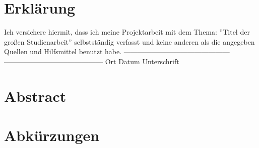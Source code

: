 \documentclass[12pt, a4paper]{scrbook}
\begin{document}

\setlength{\parindent}{0em} 
\let\cleardoublepage\relax





\section*{Erklärung}

Ich versichere hiermit, dass ich meine Projektarbeit mit dem Thema: ''Titel der großen Studienarbeit'' selbstständig verfasst und keine anderen als die angegeben Quellen und Hilfsmittel benutzt
habe.
\newline
\newline
\newline
\newline
---------------------------------------------       ------------------------------------------ \newline
Ort	\hspace{2cm}		Datum\hspace{3,5 cm}				    Unterschrift
\newpage
\section*{Abstract}


\newpage
\begingroup
\renewcommand*{\chapterpagestyle}{empty}
\pagestyle{empty}
\tableofcontents
\listoffigures





\section*{Abkürzungen}

\begin{acronym}[Bash]
\end{acronym}
\endgroup
\newpage
\pagestyle{plain}
\setcounter{page}{1}
\end{document}
